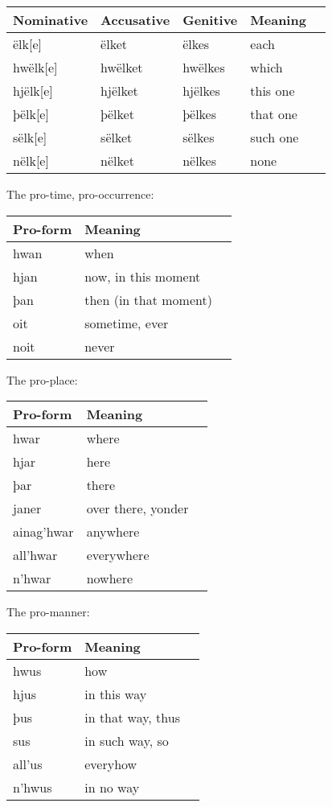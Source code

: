 \begin{center}
\begin{tabular}{lllll}
Nominative & Accusative & Genitive & Meaning \\
\hline
ëlk[e]   & ëlket   & ëlkes   & each \\
hwëlk[e] & hwëlket & hwëlkes & which \\
hjëlk[e] & hjëlket & hjëlkes  & this one \\
þëlk[e]  & þëlket  & þëlkes  & that one \\
sëlk[e]  & sëlket  & sëlkes  & such one \\
nëlk[e]  & nëlket  & nëlkes  & none \\
\end{tabular}
\end{center}

The pro-time, pro-occurrence:

\begin{center}
\begin{tabular}{lll}
Pro-form & Meaning \\
\hline
hwan & when \\
hjan & now, in this moment \\
þan & then (in that moment) \\
\hline
oit  & sometime, ever \\
noit & never \\
\end{tabular}
\end{center}

The pro-place:

\begin{center}
\begin{tabular}{lll}
Pro-form & Meaning \\
\hline
hwar       & where \\
hjar       & here \\
þar        & there \\
janer      & over there, yonder \\
ainag'hwar & anywhere \\
all'hwar   & everywhere \\
n'hwar     & nowhere \\
\end{tabular}
\end{center}

The pro-manner:

\begin{center}
\begin{tabular}{lll}
Pro-form & Meaning \\
\hline
hwus   & how \\
hjus   & in this way  \\
þus    & in that way, thus \\
sus    & in such way, so \\
all'us & everyhow \\
n'hwus & in no way \\
\end{tabular}
\end{center}

